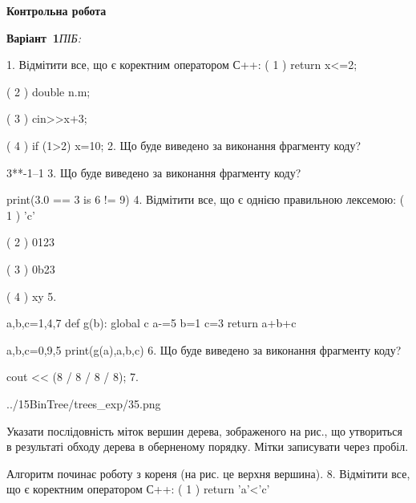 \documentclass[11pt]{article}
\begin{document}
{\large\textbf{Контрольна робота}}

\textbf{Варіант \No\,1}\hfill \textit{ПІБ:}\,\underline{\hspace{60mm}}
\vspace{4mm}

1. %
Відмітити все, що є коректним оператором С++:
( 1 ) return x<=2;

( 2 ) double n.m;

( 3 ) cin>>x+3;

( 4 ) if (1>2) x=10;
\vspace{5mm}
2. Що буде виведено за виконання фрагменту коду?

3**-1--1
\vspace{5mm}
3. Що буде виведено за виконання фрагменту коду?

print(3.0 == 3 is 6 != 9)
\vspace{5mm}
4. %
Відмітити все, що є однією правильною лексемою:
( 1 ) 'c'

( 2 ) 0123

( 3 ) 0b23

( 4 ) xy
\vspace{5mm}
5. 

a,b,c=1,4,7
def g(b):
global c    a-=5
    b=1
    c=3
    return a+b+c

a,b,c=0,9,5
print(g(a),a,b,c)
\vspace{5mm}
6. Що буде виведено за виконання фрагменту коду?

cout << (8 / 8 / 8 / 8);
\vspace{5mm}
7. 

\begin{center}
	{../15BinTree/trees_exp/35.png}
\end{center}
Указати послідовність міток вершин дерева, зображеного на рис., що утвориться в результаті обходу дерева в оберненому порядку. Мітки записувати через пробіл.\par Алгоритм починає роботу з кореня (на рис. це верхня вершина).
\vspace{5mm}
8. %
Відмітити все, що є коректним оператором С++:
( 1 ) return 'a'<'c'
\end{document}
